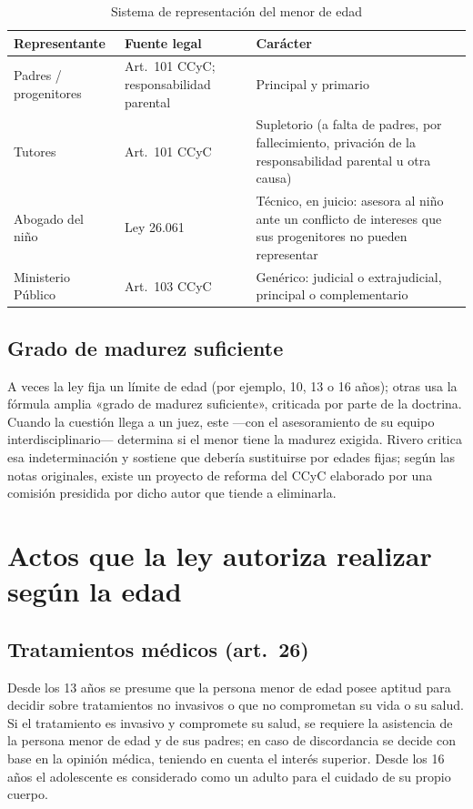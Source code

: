\documentclass[12pt,oneside]{book}
\begin{document}
\begin{table}[H]
\centering
\begin{tabularx}{\textwidth}{B{0.24\textwidth} B{0.28\textwidth} Y}
\toprule
\textbf{Representante} & \textbf{Fuente legal} & \textbf{Carácter} \\
\midrule
Padres / progenitores & Art.~101 CCyC; responsabilidad parental & Principal y primario \\
Tutores & Art.~101 CCyC & Supletorio (a falta de padres, por fallecimiento, privación de la responsabilidad parental u otra causa) \\
Abogado del niño & Ley 26.061 & Técnico, en juicio: asesora al niño ante un conflicto de intereses que sus progenitores no pueden representar \\
Ministerio Público & Art.~103 CCyC & Genérico: judicial o extrajudicial, principal o complementario \\
\bottomrule
\end{tabularx}
\caption{Sistema de representación del menor de edad}
\end{table}

\subsection{Grado de madurez suficiente}

A veces la ley fija un límite de edad (por ejemplo, 10, 13 o 16 años); otras usa la fórmula amplia «grado de madurez suficiente», criticada por parte de la doctrina. Cuando la cuestión llega a un juez, este ---con el asesoramiento de su equipo interdisciplinario--- determina si el menor tiene la madurez exigida. Rivero critica esa indeterminación y sostiene que debería sustituirse por edades fijas; según las notas originales, existe un proyecto de reforma del CCyC elaborado por una comisión presidida por dicho autor que tiende a eliminarla.

\section{Actos que la ley autoriza realizar según la edad}

\subsection{Tratamientos médicos (art.~26)}

\begin{regla}
Desde los 13 años se presume que la persona menor de edad posee aptitud para decidir sobre tratamientos no invasivos o que no comprometan su vida o su salud. Si el tratamiento es invasivo y compromete su salud, se requiere la asistencia de la persona menor de edad y de sus padres; en caso de discordancia se decide con base en la opinión médica, teniendo en cuenta el interés superior. Desde los 16 años el adolescente es considerado como un adulto para el cuidado de su propio cuerpo.
\end{regla}
\end{document}
